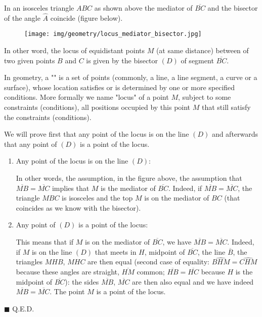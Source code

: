 	\pagebreak
	\begin{theorem}
	In an isosceles triangle $ABC$ as shown above the mediator of $\overline{BC}$ and the bisector of the angle $\hat{A}$ coincide (figure below).
	\begin{figure}[H]
		\centering
		\texttt{[image: img/geometry/locus\_mediator\_bisector.jpg]}
	\end{figure}
	In other word, the locus of equidistant points $M$ (at same distance) between of two given points $B$ and $C$ is given by the bisector $(D)$ of segment $\overline{BC}$.
	\begin{tcolorbox}[title=Remark,colframe=black,arc=10pt]
	In geometry, a "" is a set of points (commonly, a line, a line segment, a curve or a surface), whose location satisfies or is determined by one or more specified conditions. More formally we name "locus" of a point $M$, subject to some constraints (conditions), all positions occupied by this point $M$ that still satisfy the constraints (conditions).
	\end{tcolorbox}
	\end{theorem}
	\begin{dem}
	We will prove first that any point of the locus is on the line $(D)$ and afterwards that any point of $(D)$ is a point of the locus.
	\begin{enumerate}
		\item Any point of the locus is on the line $(D)$:

		In other words, the assumption, in the figure above, the assumption that $\overline{MB} =\overline{MC}$ implies that $M$ is the mediator of $\overline{BC}$. Indeed, if $\overline{MB} =\overline{MC}$, the triangle $MBC$ is isosceles and the top $M$ is on the mediator of $BC$ (that coincides as we know with the bisector).
			
		\item Any point of $(D)$ is a point of the locus:
		
		This means that if $M$ is on the mediator of $\overline{BC}$, we have $\overline{MB} = \overline{MC}$. Indeed, if $M$ is on the line $(D)$ that meets in $H$, midpoint of $\overline{BC}$, the line $\overline{B}$, the triangles $MHB$, $MHC$ are then equal (second case of equality: $\widehat{BHM}=\widehat{CHM}$ because these angles are straight, $\overline{HM}$ common; $\overline{HB} = \overline{HC}$ because $H$ is the midpoint of $\overline{BC}$): the sides $\overline{MB}$, $\overline{MC}$ are then also equal and we have indeed $\overline{MB} = \overline{MC}$. The point $M$ is a point of the locus.

	\end{enumerate}
	\begin{flushright}
		$\blacksquare$  Q.E.D.
	\end{flushright}
	\end{dem}

